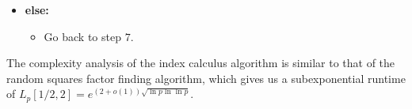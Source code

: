 \begin{algo}
\begin{enumerate}[1.]
\begin{itemize}
\begin{itemize}
                              \end{itemize}
                        \item {\bf else:}
                              \begin{itemize}
                                    \item Go back to step $7$. 
                              \end{itemize}
                  \end{itemize}
      \end{enumerate}
\end{algo}

The complexity analysis of the index calculus algorithm is similar to that of 
the random squares factor finding algorithm, which gives us a subexponential 
runtime of $L_p[1/2, 2] = e^{(2+o(1))\sqrt{\ln p \ln\ln p}}$. 